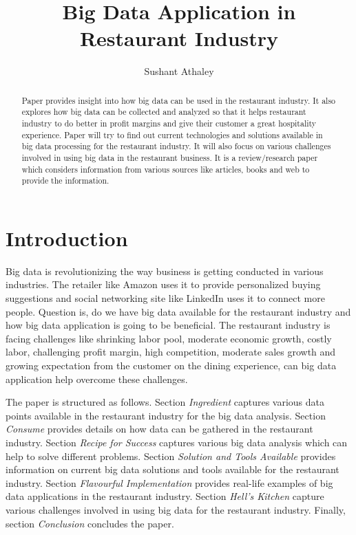 \documentclass[sigconf]{acmart}
\begin{document}
\title{Big Data Application in Restaurant Industry}


\author{Sushant Athaley}



\begin{abstract}
Paper provides insight into how big data can be used in the restaurant industry. It also explores how big data can be collected and analyzed so that it helps restaurant industry to do better in profit margins and give their customer a great hospitality experience. Paper will try to find out current technologies and solutions available in big data processing for the restaurant industry. It will also focus on various challenges involved in using big data in the restaurant business. It is a review/research paper which considers information from various sources like articles, books and web to provide the information. 
\end{abstract}



\maketitle

\section{Introduction}
Big data is revolutionizing the way business is getting conducted in various industries. The retailer like Amazon uses it to provide personalized buying suggestions and social networking site like LinkedIn uses it to connect more people. Question is, do we have big data available for the restaurant industry and how big data application is going to be beneficial. The restaurant industry is facing challenges like shrinking labor pool, moderate economic growth, costly labor, challenging profit margin, high competition, moderate sales growth and growing expectation from the customer on the dining experience, can big data application help overcome these challenges.\cite{www-restaurant-challenges}

The paper is structured as follows. Section {\em Ingredient} captures various data points available in the restaurant industry for the big data analysis. Section {\em Consume} provides details on how data can be gathered in the restaurant industry. Section {\em Recipe for Success} captures various big data analysis which can help to solve different problems. Section {\em Solution and Tools Available} provides information on current big data solutions and tools available for the restaurant industry. Section {\em Flavourful Implementation} provides real-life examples of big data applications in the restaurant industry. Section {\em Hell's Kitchen} capture various challenges involved in using big data for the restaurant industry. Finally, section {\em Conclusion} concludes the paper.
\end{document}
